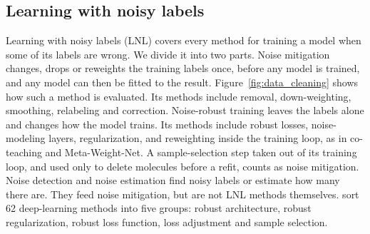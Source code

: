 \subsection{Learning with noisy labels}\label{sec:lnl_background}

Learning with noisy labels (LNL) covers every method for training a model when some of its labels are wrong. We divide it into two parts. Noise mitigation changes, drops or reweights the training labels once, before any model is trained, and any model can then be fitted to the result. Figure~\ref{fig:data_cleaning} shows how such a method is evaluated. Its methods include removal, down-weighting, smoothing, relabeling and correction. Noise-robust training leaves the labels alone and changes how the model trains. Its methods include robust losses, noise-modeling layers, regularization, and reweighting inside the training loop, as in co-teaching and Meta-Weight-Net. A sample-selection step taken out of its training loop, and used only to delete molecules before a refit, counts as noise mitigation. Noise detection and noise estimation find noisy labels or estimate how many there are. They feed noise mitigation, but are not LNL methods themselves. \citet{Song2022} sort 62 deep-learning methods into five groups: robust architecture, robust regularization, robust loss function, loss adjustment and sample selection.

